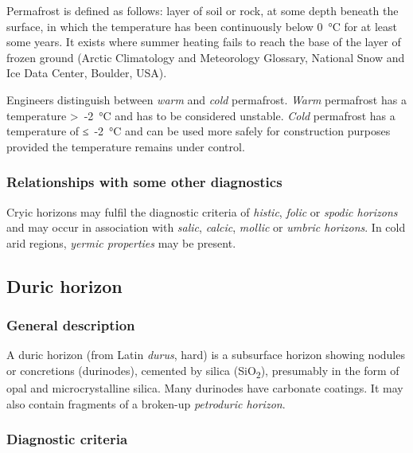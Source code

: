 \documentclass[
  letterpaper,
  DIV=11,
  numbers=noendperiod]{scrreprt}
\begin{document}
Permafrost is defined as follows: layer of soil or rock, at some depth
beneath the surface, in which the temperature has been continuously
below 0~°C for at least some years. It exists where summer heating fails
to reach the base of the layer of frozen ground (Arctic Climatology and
Meteorology Glossary, National Snow and Ice Data Center, Boulder, USA).

Engineers distinguish between \emph{warm} and \emph{cold} permafrost.
\emph{Warm} permafrost has a temperature \textgreater~-2~°C and has to
be considered unstable. \emph{Cold} permafrost has a temperature of
≤~-2~°C and can be used more safely for construction purposes provided
the temperature remains under control.

\hypertarget{relationships-with-some-other-diagnostics-7}{%
\subsubsection{Relationships with some other
diagnostics}\label{relationships-with-some-other-diagnostics-7}}

Cryic horizons may fulfil the diagnostic criteria of \emph{histic},
\emph{folic} or \emph{spodic horizons} and may occur in association with
\emph{salic}, \emph{calcic}, \emph{mollic} or \emph{umbric horizons}. In
cold arid regions, \emph{yermic properties} may be present.

\hypertarget{duric-horizon}{%
\subsection{Duric horizon}\label{duric-horizon}}

\hypertarget{general-description-8}{%
\subsubsection{General description}\label{general-description-8}}

A duric horizon (from Latin \emph{durus}, hard) is a subsurface horizon
showing nodules or concretions (durinodes), cemented by silica
(SiO\textsubscript{2}), presumably in the form of opal and
microcrystalline silica. Many durinodes have carbonate coatings. It may
also contain fragments of a broken-up \emph{petroduric horizon}.

\hypertarget{diagnostic-criteria-8}{%
\subsubsection{Diagnostic criteria}\label{diagnostic-criteria-8}}
\end{document}
